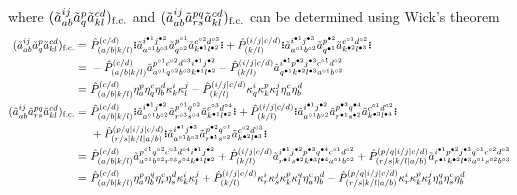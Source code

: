 \documentclass[11pt,fleqn]{article}
\newcommand{\h}{\eta}        %
\renewcommand{\k}{\kappa}    %
\newcommand{\tl}{\ensuremath{\tilde}}
\newcommand{\op}[1]{\ensuremath{\hat{#1}}}
\newcommand{\GNO}[1]{\setstackgap{S}{0.7pt}\ensuremath{\Shortstack{\textbf{.} \textbf{.} \textbf{.}}#1\Shortstack{\textbf{.} \textbf{.} \textbf{.}}}}
\theoremstyle{mystyle}
\newcommand{\hole}{\circ}
\newcommand{\ptcl}{\bullet}
\begin{document}
where $(\tl{a}_{ab}^{ij}\tl{a}_q^p\tl{a}_{kl}^{cd})_{\text{f.c.}}$ and $(\tl{a}_{ab}^{ij}\tl{a}_{rs}^{pq}\tl{a}_{kl}^{cd})_{\text{f.c.}}$ can be determined using Wick's theorem
\begin{align*}
  (\tl{a}_{ab}^{ij}\tl{a}_q^p\tl{a}_{kl}^{cd})_{\text{f.c.}}
=&\
  \op{P}^{(c/d)}
        _{(a/b|k/l)}
  \GNO{
    \tl{a}_{a^{\hole1}b^{\hole3}}
          ^{i^{\ptcl1}j^{\ptcl2}}
    \tl{a}_{q^{\hole2}}
          ^{p^{\hole1}}
    \tl{a}_{k^{\ptcl1}l^{\ptcl2}}
          ^{c^{\hole2}d^{\hole3}}
  }
+
  \op{P}^{(i/j|c/d)}
        _{(k/l)}
  \GNO{
    \tl{a}_{a^{\hole1}b^{\hole2}}
          ^{i^{\ptcl1}j^{\ptcl3}}
    \tl{a}_{q^{\ptcl1}}
          ^{p^{\ptcl2}}
    \tl{a}_{k^{\ptcl2}l^{\ptcl3}}
          ^{c^{\hole1}d^{\hole2}}
  }
\\=&\
-
  \op{P}^{(c/d)}
        _{(a/b|k/l)}
  \tl{a}_{a^{\hole1}q^{\hole2}b^{\hole3}k^{\ptcl1}l^{\ptcl2}}
        ^{p^{\hole1}c^{\hole2}d^{\hole3}i^{\ptcl1}j^{\ptcl2}}
-
  \op{P}^{(i/j|c/d)}
        _{(k/l)}
  \tl{a}_{q^{\ptcl1}k^{\ptcl2}l^{\ptcl3}a^{\hole1}b^{\hole2}}
        ^{i^{\ptcl1}p^{\ptcl2}j^{\ptcl3}c^{\hole1}d^{\hole2}}
\\=&\
  \op{P}^{(c/d)}
        _{(a/b|k/l)}
  \h_a^p\h_q^c\h_b^d\k_k^i\k_l^j
-
  \op{P}^{(i/j|c/d)}
        _{(k/l)}
  \k_q^i\k_k^p\k_l^j\h_a^c\h_b^d
\\
  (\tl{a}_{ab}^{ij}\tl{a}_{rs}^{pq}\tl{a}_{kl}^{cd})_{\text{f.c.}}
=&\
  \op{P}^{(c/d)}
        _{(a/b|k/l)}
  \GNO{
    \tl{a}_{a^{\hole1}b^{\hole2}}
          ^{i^{\ptcl1}j^{\ptcl2}}
    \tl{a}_{r^{\hole3}s^{\hole4}}
          ^{p^{\hole1}q^{\hole2}}
    \tl{a}_{k^{\ptcl1}l^{\ptcl2}}
          ^{c^{\hole3}d^{\hole4}}
  }
+
  \op{P}^{(i/j|c/d)}
        _{(k/l)}
  \GNO{
    \tl{a}_{a^{\hole1}b^{\hole2}}
          ^{i^{\ptcl1}j^{\ptcl2}}
    \tl{a}_{r^{\ptcl1}s^{\ptcl2}}
          ^{p^{\ptcl3}q^{\ptcl4}}
    \tl{a}_{k^{\ptcl3}l^{\ptcl4}}
          ^{c^{\hole1}d^{\hole2}}
  }
\\&\
+
  \op{P}^{(p/q|i/j|c/d)}
        _{(r/s|k/l|a/b)}
  \GNO{
    \tl{a}_{a^{\hole1}b^{\hole3}}
          ^{i^{\ptcl1}j^{\ptcl3}}
    \tl{a}_{r^{\ptcl1}s^{\hole2}}
          ^{p^{\ptcl2}q^{\hole1}}
    \tl{a}_{k^{\ptcl2}l^{\ptcl3}}
          ^{c^{\hole2}d^{\hole3}}
  }
\\=&\
  \op{P}^{(c/d)}
        _{(a/b|k/l)}
  \tl{a}_{a^{\hole1}b^{\hole2}r^{\hole3}s^{\hole4}
          k^{\ptcl1}l^{\ptcl2}}
        ^{p^{\hole1}q^{\hole2}c^{\hole3}d^{\hole4}
          i^{\ptcl1}j^{\ptcl2}}
+
  \op{P}^{(i/j|c/d)}
        _{(k/l)}
  \tl{a}_{r^{\ptcl1}s^{\ptcl2}k^{\ptcl3}l^{\ptcl4}
          a^{\hole1}b^{\hole2}}
        ^{i^{\ptcl1}j^{\ptcl2}p^{\ptcl3}q^{\ptcl4}
          c^{\hole1}d^{\hole2}}
+
  \op{P}^{(p/q|i/j|c/d)}
        _{(r/s|k/l|a/b)}
  \tl{a}_{r^{\ptcl1}k^{\ptcl2}l^{\ptcl3}
          a^{\hole1}s^{\hole2}b^{\hole3}}
        ^{i^{\ptcl1}p^{\ptcl2}j^{\ptcl3}
          q^{\hole1}c^{\hole2}d^{\hole3}}
\\=&\
  \op{P}^{(c/d)}
        _{(a/b|k/l)}
  \h_a^p\h_b^q\h_r^c\h_s^d
  \k_k^i\k_l^j
+
  \op{P}^{(i/j|c/d)}
        _{(k/l)}
  \k_r^i\k_s^j\k_k^p\k_l^q
  \h_a^c\h_b^d
-
  \op{P}^{(p/q|i/j|c/d)}
        _{(r/s|k/l|a/b)}
  \k_r^i\k_k^p\k_l^j
  \h_a^q\h_s^c\h_b^d
\end{align*}
\end{document}
